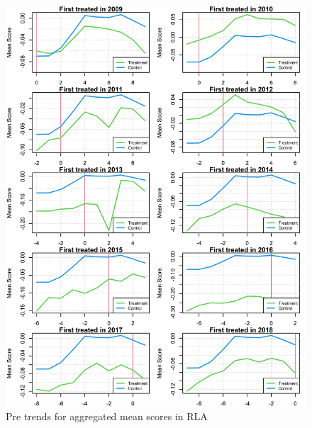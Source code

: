 \begin{figure}[!h]
	\centering
	\includegraphics[scale=1]{"../Code & Data/ParTrendsPlotRLA.png"}
	\caption{Pre trends for aggregated mean scores in RLA}
	\label{PreTrendsRLA}
\end{figure}



